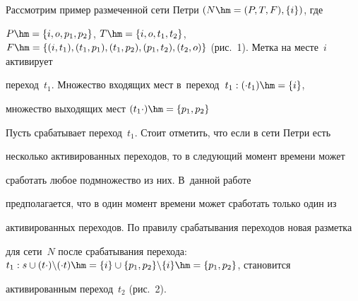   Рассмотрим пример размеченной сети Петри $(N\hm= (P,T,F), \{i\})$, где 

$P\hm= \{ i,o,p_1,p_2\}$, $T\hm= \{ i,o,t_1,t_2\}$, $F\hm= \{(i,t_1),(t_1,p_1), 

(t_1,p_2), (p_1,t_2), (t_2,o)\}$ (рис.~1). Метка на месте~$i$ активирует 

переход~$t_1$. Множество входящих мест в~переход~$t_1: (\cdot t_1)\hm= \{i\}$, 

множество выходящих мест $(t_1\cdot)\hm= \{ p_1, p_2\}$ 




 

  Пусть срабатывает переход~$t_1$. Стоит отметить, что если в сети Петри есть 

несколько активированных переходов, то в следующий момент времени может 

сработать любое подмножество из них\cite{8-tg}. В~данной работе 

предполагается, что в один момент времени может сработать только один из 

активированных переходов. По правилу срабатывания переходов новая разметка 

для сети~$N$ после срабатывания перехода: $t_1: s\cup (t\cdot)\backslash (\cdot 

t)\hm= \{i\} \cup \{ p_1, p_2\}\backslash \{i\}\hm= \{ p_1, p_2\}$, становится 

активированным переход~$t_2$ (рис.~2).



